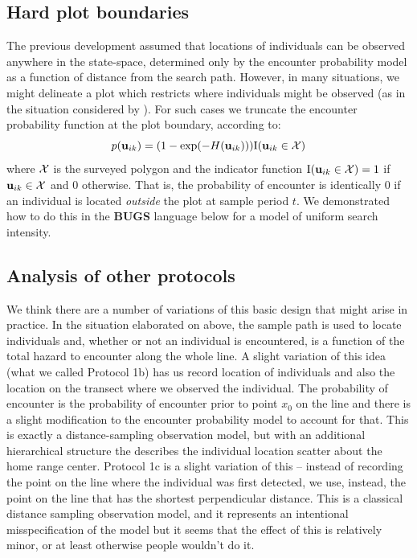 \subsection{Hard plot boundaries}

The previous development assumed that locations of individuals can be
observed anywhere in the state-space, determined only by the encounter
probability model as a function of distance from the search path.
However, in many situations, we might delineate a
plot which restricts where individuals might be observed (as in the
situation considered by \citet{royle_young:2008}).  For such cases we
truncate the encounter probability function at the plot boundary,
according to:
\begin{equation}
p({\bf u}_{ik}) = (1- \exp(-H({\bf u}_{ik}))) \mbox{I}({\bf u}_{ik} \in {\cal X})
\label{search-encounter.eq.hardplot}
\end{equation}
where ${\cal X}$ is the surveyed polygon and the indicator function
$\mbox{I}({\bf u}_{ik} \in {\cal X}) = 1$ if ${\bf u}_{ik} \in {\cal
  X}$ and 0 otherwise.  That is, the probability of encounter is
identically 0 if an individual is located {\it outside} the plot at
sample period $t$.  We demonstrated how to do this in the {\bf BUGS}
language below for a model of uniform search intensity.


\subsection{Analysis of other protocols}

We think there are a number of variations of this basic design that
might arise in practice.
In the situation elaborated on above,
the sample path is used to locate individuals and, whether or not an
individual is encountered, is a function of the total hazard to
encounter along the whole line.
A slight variation of this idea (what we called Protocol 1b)
has us record location of individuals and also the location on the
transect where we observed the individual.
The probability of encounter is the probability of encounter prior to
point $x_{0}$ on the line
\citep{skaug_schweder:1999}
and there
is a slight modification to the encounter probability model to account
for that. This is exactly a
 distance-sampling observation model, but with an
additional hierarchical structure the describes the individual
location scatter about the home range center.
Protocol 1c is a slight variation of this -- instead of recording the
point on the line where the individual was first detected, we use,
instead, the point on the line that has the shortest perpendicular
distance. This is a classical distance sampling observation model, and
it  represents an intentional misspecification of the model
but it seems that the effect of this is relatively minor, or at least
otherwise people wouldn't do it.

